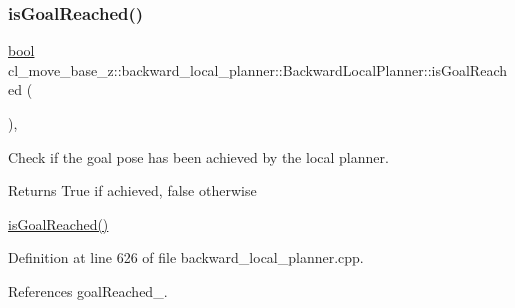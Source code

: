 \mbox{\label{classcl__move__base__z_1_1backward__local__planner_1_1BackwardLocalPlanner_a06a99e609ed31b97f765351dd6827722}} 
\subsubsection{\texorpdfstring{is\+Goal\+Reached()}{isGoalReached()}}
{\footnotesize\ttfamily \hyperlink{classbool}{bool} cl\+\_\+move\+\_\+base\+\_\+z\+::backward\+\_\+local\+\_\+planner\+::\+Backward\+Local\+Planner\+::is\+Goal\+Reached (\begin{DoxyParamCaption}{ }\end{DoxyParamCaption})\hspace{0.3cm}{\ttfamily [override]}, {\ttfamily [virtual]}}



Check if the goal pose has been achieved by the local planner. 

\begin{DoxyReturn}{Returns}
True if achieved, false otherwise
\end{DoxyReturn}
\hyperlink{classcl__move__base__z_1_1backward__local__planner_1_1BackwardLocalPlanner_a06a99e609ed31b97f765351dd6827722}{is\+Goal\+Reached()} 

Definition at line 626 of file backward\+\_\+local\+\_\+planner.\+cpp.



References goal\+Reached\+\_\+.


